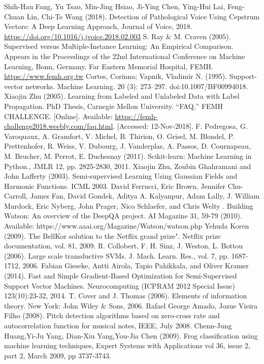 \documentclass[conference]{IEEEtran}
\begin{document}
\begin{thebibliography}{00}
Shih-Hau Fang, Yu Tsao, Min-Jing Hsiao, Ji-Ying Chen, Ying-Hui Lai, Feng-Chuan Lin, Chi-Te Wang (2018).
Detection of Pathological Voice Using Cepstrum Vectors: A Deep Learning Approach,
Journal of Voice, 2018. \url{https://doi.org/10.1016/j.jvoice.2018.02.003}
S. Ray \& M. Craven (2005).
Supervised versus Multiple-Instance Learning: An Empirical Comparison.
Appears in the Proceedings of the 22nd International Conference on Machine Learning, Bonn, Germany.
Far Eastern Memorial Hospital, FEMH. \url{https://www.femh.org.tw}
Cortes, Corinna; Vapnik, Vladimir N. (1995). Support-vector networks. Machine Learning. 20 (3): 273–297. doi:10.1007/BF00994018.
Xiaojin Zhu (2005). Learning from Labeled and Unlabeled Data with Label Propagation. PhD Thesis, Carnegie Mellon University.
“FAQ,” FEMH CHALLENGE. [Online]. Available: \url{https://femh-challenge2018.weebly.com/faq.html}. [Accessed: 12-Nov-2018].
F. Pedregosa, G. Varoquaux, A. Gramfort, V. Michel, B. Thirion, O. Grisel, M. Blondel, P. Prettenhofer, R. Weiss, V. Dubourg, J. Vanderplas, A. Passos, D. Cournapeau, M. Brucher, M. Perrot, E. Duchesnay (2011). Scikit-learn: Machine Learning in Python., JMLR 12, pp. 2825-2830, 2011.
Xiaojin Zhu, Zoubin Ghahramani and John Lafferty (2003). Semi-supervised Learning Using Gaussian Fields and Harmonic Functions. ICML 2003.
David Ferrucci, Eric Brown, Jennifer Chu-Carroll, James Fan, David Gondek, Aditya A. Kalyanpur, Adam Lally, J. William Murdock, Eric Nyberg, John Prager, Nico Schlaefer, and Chris Welty . Building Watson: An overview of the DeepQA project. AI Magazine 31, 59-79 (2010). Available: https://www.aaai.org/Magazine/Watson/watson.php
Yehuda Koren (2009). The BellKor solution to the Netflix grand prize". Netflix prize documentation, vol. 81, 2009.
R. Collobert, F. H. Sinz, J. Weston, L. Bottou (2006). Large scale transductive SVMs. J. Mach. Learn. Res., vol. 7, pp. 1687-1712, 2006.
Fabian Gieseke, Antti Airola, Tapio Pahikkala, and Oliver Kramer (2014). Fast and Simple Gradient-Based Optimization for Semi-Supervised Support Vector Machines. Neurocomputing (ICPRAM 2012 Special Issue) 123(10):23-32, 2014. 
T. Cover and J. Thomas (2006). Elements of information theory. New York: John Wiley \& Sons, 2006.
Rafael George Amado, Jozue Vieira Filho (2008). Pitch detection algorithms based on zero-cross rate and autocorrelation function for musical notes, IEEE, July 2008.
Chenn-Jung Huang,Yi-Ju Yang, Dian-Xiu Yang,You-Jia Chen (2009). Frog classification using machine learning techniques, Expert Systems with Applications vol 36, issue 2, part 2, March 2009, pp 3737-3743.
\end{thebibliography}
\end{document}
